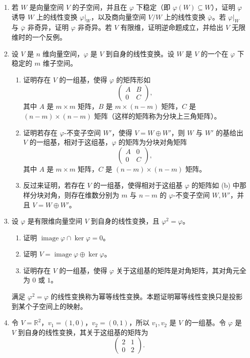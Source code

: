 \begin{enumerate}[label=\arabic*.]
\item 若 $W$ 是向量空间 $V$ 的子空间，并且在 $\varphi$ 下稳定（即 $\varphi(W)\subseteq W$），证明 $\varphi$ 诱导 $W$ 上的线性变换 $\varphi|_W$，以及商向量空间 $V/W$ 上的线性变换 $\overline\varphi$。若 $\varphi|_W$ 与 $\overline\varphi$ 非奇异，证明 $\varphi$ 非奇异。若 $V$ 有限维，证明逆命题成立，并给出 $V$ 无限维时的一个反例。
\item 设 $V$ 是 $n$ 维向量空间，$\varphi$ 是 $V$ 到自身的线性变换。设 $W$ 是 $V$ 的一个在 $\varphi$ 下稳定的 $m$ 维子空间。
\begin{enumerate}[label=(\alph*)]
\item 证明存在 $V$ 的一组基，使得 $\varphi$ 的矩阵形如
\[
\begin{pmatrix}A&B\\0&C\end{pmatrix},
\]
其中 $A$ 是 $m\times m$ 矩阵，$B$ 是 $m\times(n-m)$ 矩阵，$C$ 是 $(n-m)\times(n-m)$ 矩阵（这样的矩阵称为分块上三角矩阵）。
\item 证明若存在 $\varphi$-不变子空间 $W'$，使得 $V=W\oplus W'$，则 $W$ 与 $W'$ 的基给出 $V$ 的一组基，相对于这组基，$\varphi$ 的矩阵为分块对角矩阵
\[
\begin{pmatrix}A&0\\0&C\end{pmatrix},
\]
其中 $A$ 是 $m\times m$ 矩阵，$C$ 是 $(n-m)\times(n-m)$ 矩阵。
\item 反过来证明，若存在 $V$ 的一组基，使得相对于这组基 $\varphi$ 的矩阵如 (b) 中那样分块对角，则存在维数分别为 $m$ 与 $n-m$ 的 $\varphi$-不变子空间 $W,W'$，并且 $V=W\oplus W'$。
\end{enumerate}
\item 设 $\varphi$ 是有限维向量空间 $V$ 到自身的线性变换，且 $\varphi^2=\varphi$。
\begin{enumerate}[label=(\alph*)]
\item 证明 $\operatorname{image}\varphi\cap\ker\varphi=0$。
\item 证明 $V=\operatorname{image}\varphi\oplus\ker\varphi$。
\item 证明存在 $V$ 的一组基，使得 $\varphi$ 关于这组基的矩阵是对角矩阵，其对角元全为 $0$ 或 $1$。
\end{enumerate}
满足 $\varphi^2=\varphi$ 的线性变换称为幂等线性变换。本题证明幂等线性变换只是投影到某个子空间上的映射。
\item 令 $V=\mathbb R^2$，$v_1=(1,0)$，$v_2=(0,1)$，所以 $v_1,v_2$ 是 $V$ 的一组基。令 $\varphi$ 是 $V$ 到自身的线性变换，其关于这组基的矩阵为
\[
\begin{pmatrix}2&1\\0&2\end{pmatrix}.
\]
\end{enumerate}

